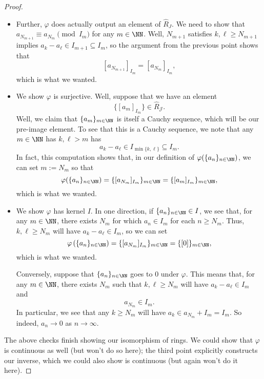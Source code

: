 \begin{proof}
\begin{itemize}
		\item Further, $\varphi$ does actually output an element of $\widehat R_J$. We need to show that $a_{N_{m+1}}\equiv a_{N_m}\pmod{I_m}$ for any $m\in\NN$. Well, $N_{m+1}$ satisfies $k,\ell\ge N_{m+1}$ implies $a_k-a_\ell\in I_{m+1}\subseteq I_m$, so the argument from the previous point shows that
		\[[a_{N_{m+1}}]_{I_m}=[a_{N_m}]_{I_m},\]
		which is what we wanted.
	
		\item We show $\varphi$ is surjective. Well, suppose that we have an element
		\[\{[a_m]_{I_m}\}\in\widehat R_\mathcal J.\]
		Well, we claim that $\{a_m\}_{m\in\NN}$ is itself a Cauchy sequence, which will be our pre-image element. To see that this is a Cauchy sequence, we note that any $m\in\NN$ has $k,\ell>m$ has
		\[a_k-a_\ell\in I_{\min\{k,\ell\}}\subseteq I_m.\]
		In fact, this computation shows that, in our definition of $\varphi(\{a_n\}_{n\in\NN})$, we can set $m:=N_m$ so that
		\[\varphi(\{a_n\}_{n\in\NN})=\{[a_{N_m}]_{I_m}\}_{m\in\NN}=\{[a_m]_{I_m}\}_{m\in\NN},\]
		which is what we wanted.

		\item We show $\varphi$ has kernel $I$. In one direction, if $\{a_n\}_{n\in\NN}\in I$, we see that, for any $m\in\NN$, there exists $N_m$ for which $a_n\in I_m$ for each $n\ge N_m$. Thus, $k,\ell\ge N_m$ will have $a_k-a_\ell\in I_m$, so we can set
		\[\varphi\left(\{a_n\}_{n\in\NN}\right)=\{[a_{N_m}]_{I_m}\}_{m\in\NN}=\{[0]\}_{m\in\NN},\]
		which is what we wanted.
		
		Conversely, suppose that $\{a_n\}_{n\in\NN}$ goes to $0$ under $\varphi$. This means that, for any $m\in\NN$, there exists $N_m$ such that $k,\ell\ge N_m$ will have $a_k-a_\ell\in I_m$ and
		\[a_{N_m}\in I_m.\]
		In particular, we see that any $k\ge N_m$ will have $a_k\in a_{N_m}+I_m=I_m$. So indeed, $a_n\to0$ as $n\to\infty$.
	\end{itemize}
	The above checks finish showing our isomorphism of rings. We could show that $\varphi$ is continuous as well (but won't do so here); the third point explicitly constructs our inverse, which we could also show is continuous (but again won't do it here).


\end{proof}
